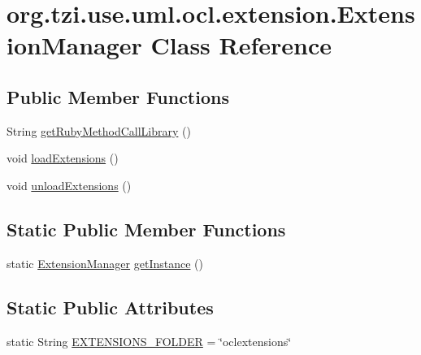 \hypertarget{classorg_1_1tzi_1_1use_1_1uml_1_1ocl_1_1extension_1_1_extension_manager}{\section{org.\-tzi.\-use.\-uml.\-ocl.\-extension.\-Extension\-Manager Class Reference}
\label{classorg_1_1tzi_1_1use_1_1uml_1_1ocl_1_1extension_1_1_extension_manager}
}
\subsection*{Public Member Functions}
\begin{DoxyCompactItemize}
\item 
String \hyperlink{classorg_1_1tzi_1_1use_1_1uml_1_1ocl_1_1extension_1_1_extension_manager_a2cbab049a0955f615fb5bf6418943ea6}{get\-Ruby\-Method\-Call\-Library} ()
\item 
void \hyperlink{classorg_1_1tzi_1_1use_1_1uml_1_1ocl_1_1extension_1_1_extension_manager_a4fdeb6372acd7dbbbb9a90e7e858c4c9}{load\-Extensions} ()
\item 
void \hyperlink{classorg_1_1tzi_1_1use_1_1uml_1_1ocl_1_1extension_1_1_extension_manager_a9c68ccceb860d692d4c141840139c4e1}{unload\-Extensions} ()
\end{DoxyCompactItemize}
\subsection*{Static Public Member Functions}
\begin{DoxyCompactItemize}
\item 
static \hyperlink{classorg_1_1tzi_1_1use_1_1uml_1_1ocl_1_1extension_1_1_extension_manager}{Extension\-Manager} \hyperlink{classorg_1_1tzi_1_1use_1_1uml_1_1ocl_1_1extension_1_1_extension_manager_a39286f1d77988e4b4931ce5b2c27b8b2}{get\-Instance} ()
\end{DoxyCompactItemize}
\subsection*{Static Public Attributes}
\begin{DoxyCompactItemize}
\item 
static String \hyperlink{classorg_1_1tzi_1_1use_1_1uml_1_1ocl_1_1extension_1_1_extension_manager_a0a193bfedc1de5b133c6a8581853de22}{E\-X\-T\-E\-N\-S\-I\-O\-N\-S\-\_\-\-F\-O\-L\-D\-E\-R} = \char`\"{}oclextensions\char`\"{}
\end{DoxyCompactItemize}
